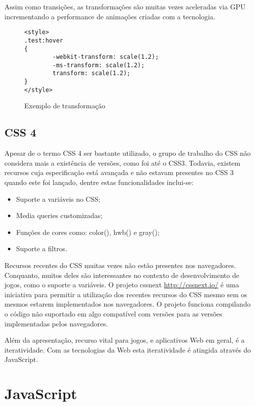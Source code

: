 Assim como transições, as transformações são muitas vezes aceleradas
via GPU incrementando a performance de animações criadas com a tecnologia.

\begin{figure}[H]
\centering
\begin{verbatim}
<style>
.test:hover
{
        -webkit-transform: scale(1.2);
        -ms-transform: scale(1.2);
        transform: scale(1.2);
}
</style>
\end{verbatim}
\caption{Exemplo de transformação}
\label{fig:CSSTransform}
\end{figure}

\subsection{CSS 4}

Apesar de o termo CSS 4 ser bastante utilizado, o grupo de trabalho do CSS
não considera mais a existência de versões, como foi até o CSS3.
Todavia, existem recursos cuja especificação está avançada e não estavam presentes
no CSS 3 quando este foi lançado, dentre estas funcionalidades inclui-se:

\begin{itemize}
\item Suporte a variáveis no CSS;
\item Media queries customizadas;
\item Funções de cores como: color(), hwb() e gray();
\item Suporte a filtros.
\end{itemize}

Recursos recentes do CSS muitas vezes não estão presentes nos
navegadores. Conquanto, muitos deles são interessantes no contexto de
desenvolvimento de jogos, como o suporte a variáveis. O projeto cssnext
\url{http://cssnext.io/} é uma iniciativa para permitir a utilização
dos recentes recursos do CSS mesmo sem os mesmos estarem implementados
nos navegadores. O projeto funciona compilando o código não suportado
em algo compatível com versões para as versões implementadas pelos
navegadores.

Além da apresentação, recurso vital para jogos, e aplicativos Web em
geral, é a iteratividade. Com as tecnologias da Web esta iteratividade
é atingida através do JavaScript.
\section{JavaScript}

